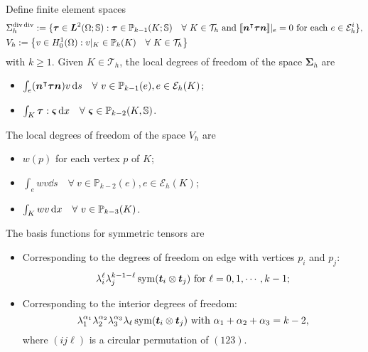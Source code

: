 Define finite element spaces
\begin{align*}
&\Sigma_h^{\operatorname{div}\operatorname{div}}:=\{\boldsymbol\tau\in\boldsymbol L^2(\Omega;\mathbb S):\boldsymbol\tau\in \mathbb P_{k-1}(K;\mathbb S)\quad\forall~K\in\mathcal T_h\textrm{ and }\llbracket \boldsymbol{n}^{\intercal}\boldsymbol\tau\boldsymbol{n}\rrbracket|_e=0\textrm{ for each } e\in\mathcal E_h^i\},
\\
&V_h:=\left\{v\in H_0^1(\Omega): v|_K\in \mathbb P_{k}(K)\quad\forall~K\in\mathcal T_h\right\}
\end{align*}
with $k\geq1$. Given $K\in\mathcal T_h$, the local degrees of freedom of the space $\boldsymbol\Sigma_h$ are
\begin{itemize}
\item $\int_e(\boldsymbol{n}^{\intercal}\boldsymbol\tau\boldsymbol{n})v\,{\rm d} s\quad\forall~v\in \mathbb P_{k-1}(e), e\in\mathcal E_h(K)$;
\item $\int_K\boldsymbol\tau:\boldsymbol\varsigma\,{\rm d}x\quad\forall~\boldsymbol\varsigma\in \mathbb P_{k-2}(K, \mathbb S)$.
\end{itemize}
The local degrees of freedom of the space $V_h$ are
\begin{itemize}
\item $w(p)$ for each vertex $p$ of $K$;
\item $\int_ewv\dd s\quad\forall~v\in \mathbb P_{k-2}(e), e\in\mathcal E_h(K)$;
\item $\int_Kwv\,{\rm d}x\quad\forall~v\in \mathbb P_{k-3}(K)$.
\end{itemize}
The basis functions for symmetric tensors %
are
\begin{itemize}
\item Corresponding to the degrees of freedom on edge with vertices $p_i$ and $p_j$: 
$$
\lambda_i^{\ell}\lambda_j^{k-1-\ell}\operatorname{sym}(\boldsymbol{t}_i\otimes\boldsymbol{t}_j) \textrm{ for } \ell=0,1,\cdots, k-1;
$$
\item Corresponding to the interior degrees of freedom: 
$$
\lambda_1^{\alpha_1}\lambda_2^{\alpha_2}\lambda_3^{\alpha_3}\lambda_{\ell}\operatorname{sym}(\boldsymbol{t}_i\otimes \boldsymbol{t}_j) \textrm{ with } \alpha_1+\alpha_2+\alpha_3=k-2,
$$
where $(ij\ell)$ is a circular permutation of $(123)$.
\end{itemize}

